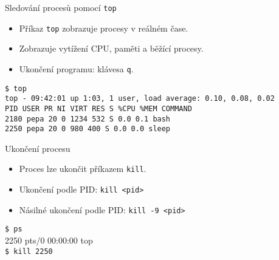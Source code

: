 \documentclass{beamer}
\begin{document}
\begin{frame}[fragile]{Sledování procesů pomocí \texttt{top}}
	\begin{itemize}
		\item Příkaz \texttt{top} zobrazuje procesy v reálném čase.
		\item Zobrazuje vytížení CPU, paměti a běžící procesy.
		\item Ukončení programu: klávesa \texttt{q}.
	\end{itemize}
	\vspace{0.5em}
	\hspace{2em}\texttt{\$ top} \\[0.3em]
	\texttt{top - 09:42:01 up 1:03, 1 user, load average: 0.10, 0.08, 0.02}\\
	\texttt{PID USER \hspace{0.5em}PR \hspace{0.5em}NI \hspace{0.5em}VIRT \hspace{0.5em}RES \hspace{0.5em}S \hspace{0.5em}\%CPU \hspace{0.5em}\%MEM \hspace{0.5em}COMMAND}\\
	\texttt{2180 pepa \hspace{0.6em}20 \hspace{0.5em}0 \hspace{0.1em} 1234 \hspace{0.5em}532 \hspace{0.5em}S \hspace{0.5em}0.0 \hspace{0.5em}0.1 \hspace{0.5em}bash}\\
	\texttt{2250 pepa \hspace{0.6em}20 \hspace{0.5em}0 \hspace{0.5em} 980 \hspace{0.5em}400 \hspace{0.5em}S \hspace{0.5em}0.0 \hspace{0.5em}0.0 \hspace{0.5em}sleep}
\end{frame}

\begin{frame}[fragile]{Ukončení procesu}
	\begin{itemize}
		\item Proces lze ukončit příkazem \texttt{kill}.
		\item Ukončení podle PID: \texttt{kill <pid>}
		\item Násilné ukončení podle PID: \texttt{kill -9 <pid>}
	\end{itemize}
	\vspace{0.5em}
	\hspace{2em}\texttt{\$ ps} \\
	\hspace{2em}2250 pts/0 00:00:00 top \\
	\hspace{2em}\texttt{\$ kill 2250} \\
\end{frame}
\end{document}
